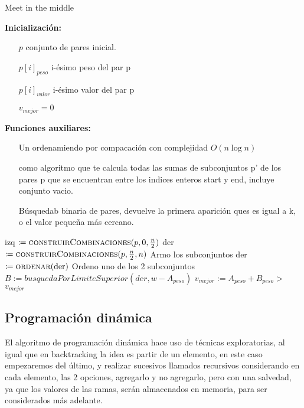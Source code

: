 \documentclass[fleqn, 11pt]{article}
\def\is{\coloneqq}
\begin{document}
\begin{algorithm}
\caption{Meet in the middle}
\begin{algorithmic}[1]
\item[\textbf{Inicialización:}]
\item[] \begin{itemize}
	\item[] $p$ conjunto de pares inicial.
	\item[] $p[i]_{peso}$ i-ésimo peso del par p
	\item[] $p[i]_{valor}$ i-ésimo valor del par p
	\item[] $v_{mejor} = 0$
\end{itemize}
\item[\textbf{Funciones auxiliares:}]
\item[] \begin{itemize}
	\item[]  Un ordenamiendo por compacación con
	complejidad $O(n\log n)$

	\item[]  como algoritmo
	que te calcula todas las sumas de subconjuntos p' de los pares p que se
	encuentran entre los indices enteros start y end, incluye conjunto
	vacio.

	\item[]  Búsquedab binaria de
	pares, devuelve la primera aparición ques es igual a k, o el valor
	pequeña más cercano.
\end{itemize}
\Statex
{}
\State izq $\is \Call{construirCombinaciones}{p, 0, \frac{n}{2}}$
\State der $\is \Call{construirCombinaciones}{p, \frac{n}{2}, n}$
\Comment Armo los subconjuntos
\State der $\is \Call{ordenar}{\text{der}}$
\Comment Ordeno uno de los 2 subconjuntos
	\State $B := busquedaPorLimiteSuperior(der, w - A_{peso})$
			\State  $v_{mejor} := A_{peso} + B_{peso} > $
		\EndIf
	\EndIf
\EndFor
\State \Return $v_{mejor}$
\EndFunction
\end{algorithmic}
\end{algorithm}

\subsection{Programación dinámica}

El algoritmo de programación dinámica hace uso de técnicas exploratorias, al
igual que en backtracking la idea es partir de un elemento, en este caso
empezaremos del último, y realizar sucesivos llamados recursivos considerando
en cada elemento, las 2 opciones, agregarlo y no agregarlo, pero con una
salvedad, ya que los valores de las ramas, serán almacenados en memoria, para
ser considerados más adelante.
\end{document}
